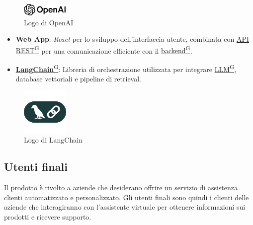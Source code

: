 \begin{figure}[H]

    \centering
    \includegraphics[width=0.2\textwidth]{img/openai-lockup.png}
    \caption{Logo di OpenAI}
    \label{fig:openai_logo}

\end{figure}

\begin{itemize}
    \item \textbf{Web App}: \textit{React} per lo sviluppo dell’interfaccia utente, combinata con \href{https://code7crusaders.github.io/docs/PB/documentazione_interna/glossario.html#api-rest-representational-state-transfer}{API REST\textsuperscript{G}} per una comunicazione efficiente con il \href{https://code7crusaders.github.io/docs/PB/documentazione_interna/glossario.html#backend}{backend\textsuperscript{G}}.
    \item \href{https://code7crusaders.github.io/docs/PB/documentazione_interna/glossario.html#langchain}{\textbf{LangChain}\textsuperscript{G}}: Libreria di orchestrazione utilizzata per integrare \href{https://code7crusaders.github.io/docs/PB/documentazione_interna/glossario.html#llm-large-language-model}{LLM\textsuperscript{G}}, database vettoriali e pipeline di retrieval.
\end{itemize}

\begin{figure}[H]
    \centering
    \includegraphics[width=0.2\textwidth]{img/lang-chain.png}
    \caption{Logo di LangChain}
    \label{fig:langchain_logo}
\end{figure}


\subsection{Utenti finali}
Il prodotto è rivolto a aziende che desiderano offrire un servizio di assistenza 
clienti automatizzato e personalizzato. Gli utenti finali sono quindi i clienti 
delle aziende che interagiranno con l’assistente virtuale per ottenere 
informazioni sui prodotti e ricevere supporto.